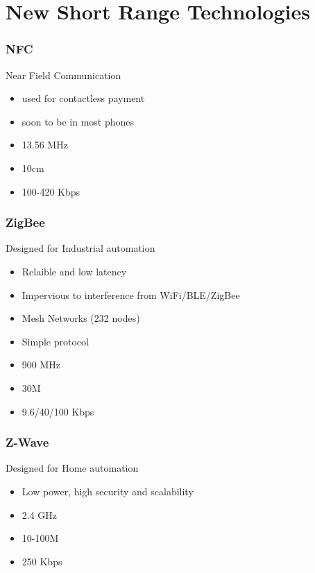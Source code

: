 \documentclass{beamer}
\begin{document}
 \section{New Short Range Technologies}
  \begin{frame}
  	\frametitle{NFC}
  	Near Field Communication
  	\begin{itemize}
  	\item used for contactless payment
  	\item soon to be in most phones
  	\item 13.56 MHz
  	\item 10cm
  	\item 100-420 Kbps
  	\end{itemize}
  \end{frame}
    \begin{frame}
  	\frametitle{ZigBee}
  	Designed for Industrial automation
  	\begin{itemize}
  	\item Relaible and low latency
  	\item Impervious to interference from WiFi/BLE/ZigBee
  	\item Mesh Networks (232 nodes)
  	\item Simple protocol
  	\item 900 MHz
  	\item 30M
  	\item 9.6/40/100 Kbps
  	\end{itemize}
  \end{frame} 
  \begin{frame}
  	\frametitle{Z-Wave}
  	Designed for Home automation
  	\begin{itemize}
  	\item Low power, high security and scalability
  	\item 2.4 GHz
  	\item 10-100M
  	\item 250 Kbps
  	\end{itemize}
  \end{frame}   
\end{document}
